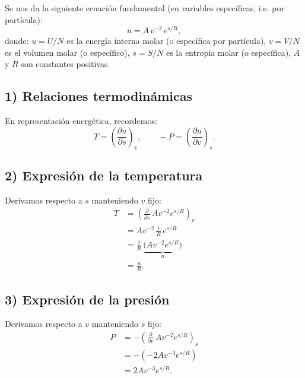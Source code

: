\documentclass{article}
\begin{document}
Se nos da la siguiente ecuación fundamental (en variables específicas, i.e. por partícula):
\[
u = A\,v^{-2}\,e^{s/R},
\]
donde:
\(u = U/N\) es la energía interna molar (o específica por partícula),
\(v = V/N\) es el volumen molar (o específico),
\(s = S/N\) es la entropía molar (o específica),
\(A\) y \(R\) son constantes positivas.


\subsection*{1) Relaciones termodinámicas}

En representación energética, recordemos:
\[
T = \left(\frac{\partial u}{\partial s}\right)_{v},
\qquad
-P = \left(\frac{\partial u}{\partial v}\right)_{s}.
\]

\subsection*{2) Expresión de la temperatura}

Derivamos respecto a \(s\) manteniendo \(v\) fijo:
\begin{equation*}
\begin{split}
T
&= \left(\frac{\partial}{\partial s}\,A v^{-2} e^{s/R}\right)_{v} \\[6pt]
&= A v^{-2}\,\frac{1}{R}\,e^{s/R} \\[6pt]
&= \frac{1}{R}\,\underbrace{\big(A v^{-2} e^{s/R}\big)}_{u} \\[6pt]
&= \frac{u}{R}.
\end{split}
\end{equation*}


\subsection*{3) Expresión de la presión}

Derivamos respecto a \(v\) manteniendo \(s\) fijo:
\begin{equation*}
\begin{split}
P
&= -\left(\frac{\partial}{\partial v}\,A v^{-2} e^{s/R}\right)_{s} \\[6pt]
&= -\left(-2A v^{-3} e^{s/R}\right) \\[6pt]
&= 2A v^{-3} e^{s/R}.
\end{split}
\end{equation*}
\end{document}
